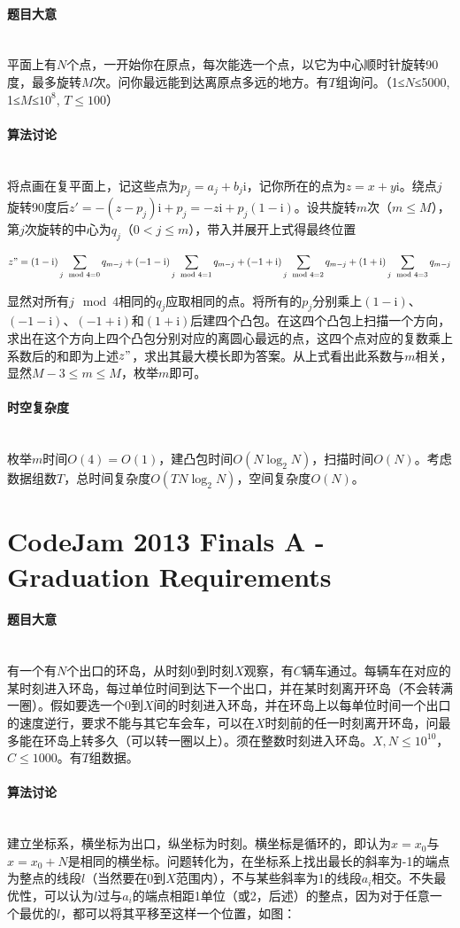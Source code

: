 \documentclass[UTF8]{ctexart}
\newcommand{\myparagraph}[1]{\paragraph{#1}\mbox{}\\}
\theoremstyle{nonumberplain}
\begin{document}
		\myparagraph{题目大意}
		
			平面上有$N$个点，一开始你在原点，每次能选一个点，以它为中心顺时针旋转90度，最多旋转$M$次。问你最远能到达离原点多远的地方。有$T$组询问。（1≤$N$≤5000, 1≤$M$≤$10^8$, $T \leq 100$）
		
		\myparagraph{算法讨论}
		
			将点画在复平面上，记这些点为$p_j=a_j+b_j\mathrm{i}$，记你所在的点为$z=x+y\mathrm{i}$。绕点$j$旋转90度后$z'=-(z-p_j)\mathrm{i}+p_j=-z\mathrm{i}+p_j(1-\mathrm{i})$。设共旋转$m$次（$m \leq M$），第$j$次旋转的中心为$q_j$（$0<j \leq m$），带入并展开上式得最终位置
			
			$$z"=(1-\mathrm{i})\sum_{j\mod 4=0}q_{m-j}+(-1-\mathrm{i})\sum_{j\mod 4=1}q_{m-j}+(-1+\mathrm{i})\sum_{j\mod 4=2}q_{m-j}+(1+\mathrm{i})\sum_{j\mod 4=3}q_{m-j}$$
			
			显然对所有$j\mod 4$相同的$q_j$应取相同的点。将所有的$p_j$分别乘上$(1-\mathrm{i})$、$(-1-\mathrm{i})$、$(-1+\mathrm{i})$和$(1+\mathrm{i})$后建四个凸包。在这四个凸包上扫描一个方向，求出在这个方向上四个凸包分别对应的离圆心最远的点，这四个点对应的复数乘上系数后的和即为上述$z"$，求出其最大模长即为答案。从上式看出此系数与$m$相关，显然$M-3 \leq m \leq M$，枚举$m$即可。
		
		\myparagraph{时空复杂度}
	
			枚举$m$时间$O(4)=O(1)$，建凸包时间$O(N\log_2N)$，扫描时间$O(N)$。考虑数据组数$T$，总时间复杂度$O(TN\log_2N)$，空间复杂度$O(N)$。
	
	\section{CodeJam 2013 Finals A - Graduation Requirements}
	
		\myparagraph{题目大意}
		
			有一个有$N$个出口的环岛，从时刻0到时刻$X$观察，有$C$辆车通过。每辆车在对应的某时刻进入环岛，每过单位时间到达下一个出口，并在某时刻离开环岛（不会转满一圈）。假如要选一个0到$X$间的时刻进入环岛，并在环岛上以每单位时间一个出口的速度逆行，要求不能与其它车会车，可以在$X$时刻前的任一时刻离开环岛，问最多能在环岛上转多久（可以转一圈以上）。须在整数时刻进入环岛。$X,N \leq 10^{10}$，$C \leq 1000$。有$T$组数据。
		
		\myparagraph{算法讨论}
		
			建立坐标系，横坐标为出口，纵坐标为时刻。横坐标是循环的，即认为$x=x_0$与$x=x_0+N$是相同的横坐标。问题转化为，在坐标系上找出最长的斜率为-1的端点为整点的线段$l$（当然要在0到$X$范围内），不与某些斜率为1的线段$a_i$相交。不失最优性，可以认为$l$过与$a_i$的端点相距1单位（或2，后述）的整点，因为对于任意一个最优的$l$，都可以将其平移至这样一个位置，如图：
			
\end{document}

